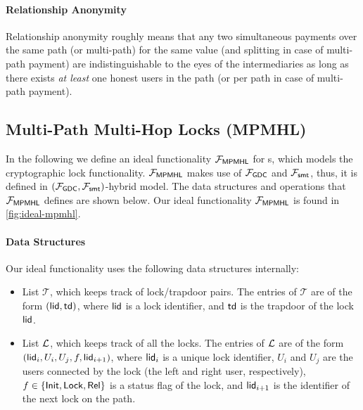 \paragraph{Relationship Anonymity}
Relationship anonymity roughly means that any two simultaneous payments over the same path (or 
multi-path) for the same value (and splitting in case of multi-path payment) are 
indistinguishable to the eyes of the intermediaries as long as there exists \emph{at least} 
one honest users in the path (or per path in case of multi-path payment). 

\subsection{Multi-Path Multi-Hop Locks (MPMHL)}
\label{sec:mpmhl}

In the following we define an ideal functionality $\mathcal{F}_{\mathsf{MPMHL}}$ for {\sysname}s, which 
models the cryptographic lock functionality. 
$\mathcal{F}_{\mathsf{MPMHL}}$ makes use of $\mathcal{F}_{\mathsf{GDC}}$ and $\mathcal{F}_{\mathsf{smt}}$, thus, it is 
defined in $(\mathcal{F}_{\mathsf{GDC}}, \mathcal{F}_{\mathsf{smt}})$-hybrid model. The data structures and 
operations that $\mathcal{F}_{\mathsf{MPMHL}}$ defines are shown below. Our ideal functionality 
$\mathcal{F}_{\mathsf{MPMHL}}$ is found in \cref{fig:ideal-mpmhl}.

\paragraph{Data Structures}
Our ideal functionality uses the following data structures internally:

\begin{itemize}
	\item List $\mathcal{T}$, which keeps track of lock/trapdoor pairs. The entries of 
	$\mathcal{T}$ are of the form $(\mathsf{lid},\mathsf{td})$, where $\mathsf{lid}$ is a lock identifier, and 
	$\mathsf{td}$ is the trapdoor of the lock $\mathsf{lid}$.
	\item List $\mathcal{L}$, which keeps track of all the locks. The entries of $\mathcal{L}$ are of the form 
	$(\mathsf{lid}_i, U_i, U_j, f, \mathsf{lid}_{i+1})$, where $\mathsf{lid}_i$ is a unique lock identifier, $U_i$ 
	and $U_j$ are the users connected by the lock (the left and right user, respectively), 
	$f \in \{\mathsf{Init},\mathsf{Lock},\mathsf{Rel}\}$ is a status flag of the lock, and $\mathsf{lid}_{i+1}$ is the 
	identifier of the next lock on the path.
\end{itemize}

